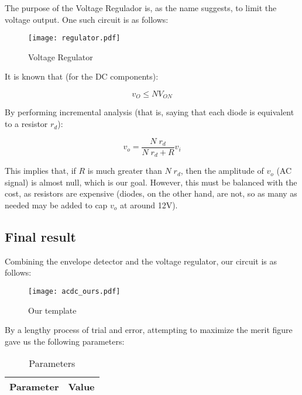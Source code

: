 The purpose of the Voltage Regulador is, as the name suggests, to limit the voltage output. One such circuit is as follows:

\begin{figure}[H]
        \centering
        \texttt{[image: regulator.pdf]}
        \caption{Voltage Regulator}
        \label{envelope}
\end{figure}

It is known that (for the DC components):

\begin{equation}
        v_O \leq N V_{ON}
        \label{max}
\end{equation}

By performing incremental analysis (that is, saying that each diode is equivalent to a resistor $r_d$):

\begin{equation}
        v_o = \frac{N\;r_d}{N\;r_d + R} v_i
        \label{vo}
\end{equation}

This implies that, if $R$ is much greater than $N\;r_d$, then the amplitude of $v_o$ (AC signal) is almost null, which is our goal. However, this must be balanced with the cost, as resistors are expensive (diodes, on the other hand, are not, so as many as needed may be added to cap $v_o$ at around 12V).

\subsection{Final result}

Combining the envelope detector and the voltage regulator, our circuit is as follows:

\begin{figure}[H]
        \centering
        \texttt{[image: acdc\_ours.pdf]}
        \caption{Our template}
        \label{acdc_ours}
\end{figure}

By a lengthy process of trial and error, attempting to maximize the merit figure gave us the following parameters:

\begin{table}[H]
        \centering
        \begin{tabular}{|c|c|}
        \hline
        Parameter & Value \\
        \hline
        
        \hline
        \end{tabular}
        \caption{Parameters}
        \label{param}
\end{table}

